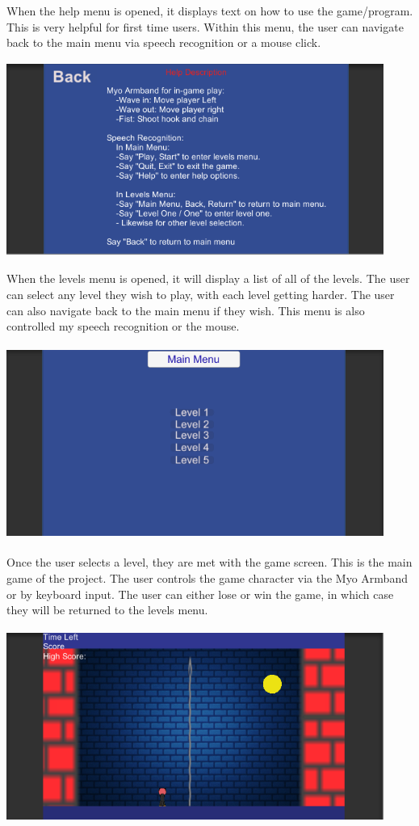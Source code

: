 \documentclass{article}
\begin{document}
When the help menu is opened, it displays text on how to use the game/program. This is very helpful for first time users. Within this menu, the user can navigate back to the main menu via speech recognition or a mouse click.

\bigskip
\includegraphics[width=350pt, height=180pt]{img/helpmenu.PNG}
\bigskip

When the levels menu is opened, it will display a list of all of the levels. The user can select any level they wish to play, with each level getting harder. The user can also navigate back to the main menu if they wish. This menu is also controlled my speech recognition or the mouse.

\bigskip
\includegraphics[width=350pt, height=180pt]{img/levelsmenu.PNG}
\bigskip

Once the user selects a level, they are met with the game screen. This is the main game of the project. The user controls the game character via the Myo Armband or by keyboard input. The user can either lose or win the game, in which case they will be returned to the levels menu.

\bigskip
\includegraphics[width=350pt, height=180pt]{img/gamemenu.PNG}
\bigskip
\end{document}
